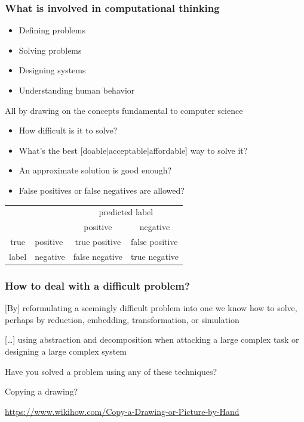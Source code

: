 \documentclass[xcolor=x11names]{beamer}
\newcommand{\light}[1]{\textcolor{gray}{#1}}
\begin{document}
\begin{frame}
\frametitle{What is involved in computational thinking}

\begin{itemize}
 \item Defining problems				\pause 
 \item Solving problems					\pause
 \item Designing systems				\pause
 \item Understanding human behavior
\end{itemize}
\bigskip

All by drawing on the concepts fundamental to computer science
\bigskip 									\pause

\begin{itemize}
 \item How difficult is it to solve?			\pause
 \item What’s the best [doable$\mid$acceptable$\mid$affordable] way to solve it?	
\pause
 \item An approximate solution is good enough?	\pause
 \item False positives or false negatives are allowed?	\pause
\end{itemize}
\begin{center}
\begin{tabular}{cccc}
                 &              & \multicolumn{2}{c}{\alert{predicted label}}   
\\
                 &              &  positive     & negative      \\\cline{3-4}
\alert{true}& \multicolumn{1}{l|}{positive}& true positive      & 
\multicolumn{1}{l|}{false positive}\\
\alert{label}& \multicolumn{1}{l|}{negative}& false negative& 
\multicolumn{1}{l|}{true negative} \\\cline{3-4}
\end{tabular}
\end{center}
\end{frame}

\begin{frame}
\frametitle{How to deal with a difficult problem?}

[By] reformulating a seemingly difficult problem into one we know how to solve, 
perhaps by reduction, embedding, transformation, or simulation	\pause
\medskip

[\ldots] using abstraction and decomposition when attacking a large complex task 
or designing a large complex system
\bigskip 		\pause

Have \alert{you} solved a problem using any of these techniques?	\pause
\bigskip					\pause

\alert{Copying a drawing?}

\light{\url{https://www.wikihow.com/Copy-a-Drawing-or-Picture-by-Hand}}
\end{frame}
\end{document}
